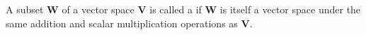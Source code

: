 \begin{dfn}
A subset \( \mathbf{W} \) of a vector space \( \mathbf{V} \) is called a  if \( \mathbf{W} \) is itself a vector space under the same addition and scalar multiplication operations as \( \mathbf{V} \).
\end{dfn}